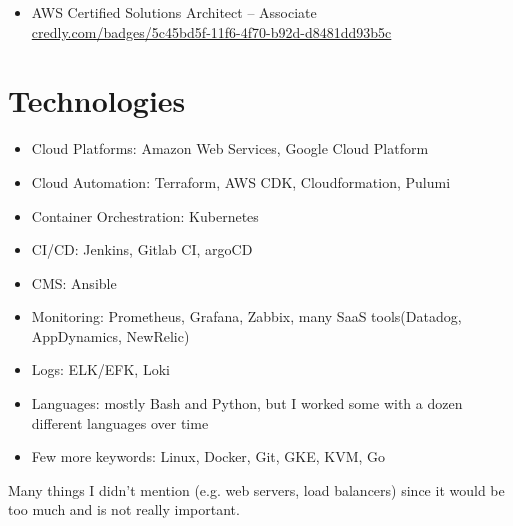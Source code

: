 \documentclass[11pt]{letter}
\newcommand{\forceindent}{\leavevmode{\parindent=1em\indent} %
}
\begin{document}
\begin{itemize}
    \item AWS Certified Solutions Architect – Associate \\
    \href{https://www.credly.com/badges/5c45bd5f-11f6-4f70-b92d-d8481dd93b5c}{credly.com/badges/5c45bd5f-11f6-4f70-b92d-d8481dd93b5c}
\end{itemize}

\section*{Technologies\vphantom{tech}}

\begin{itemize}
  \item Cloud Platforms: Amazon Web Services, Google Cloud Platform
  \item Cloud Automation: Terraform, AWS CDK, Cloudformation, Pulumi
  \item Container Orchestration: Kubernetes
  \item CI/CD: Jenkins, Gitlab CI, argoCD
  \item CMS: Ansible
  \item Monitoring: Prometheus, Grafana, Zabbix, many SaaS tools(Datadog, AppDynamics, NewRelic)
  \item Logs: ELK/EFK, Loki
  \item Languages: mostly Bash and Python, but I worked some with a dozen different languages over time
  \item Few more keywords: Linux, Docker, Git, GKE, KVM, Go
\end{itemize}

\forceindent Many things I didn't mention (e.g. web servers, load balancers) since it would be too much and is not really important.


\end{document}
